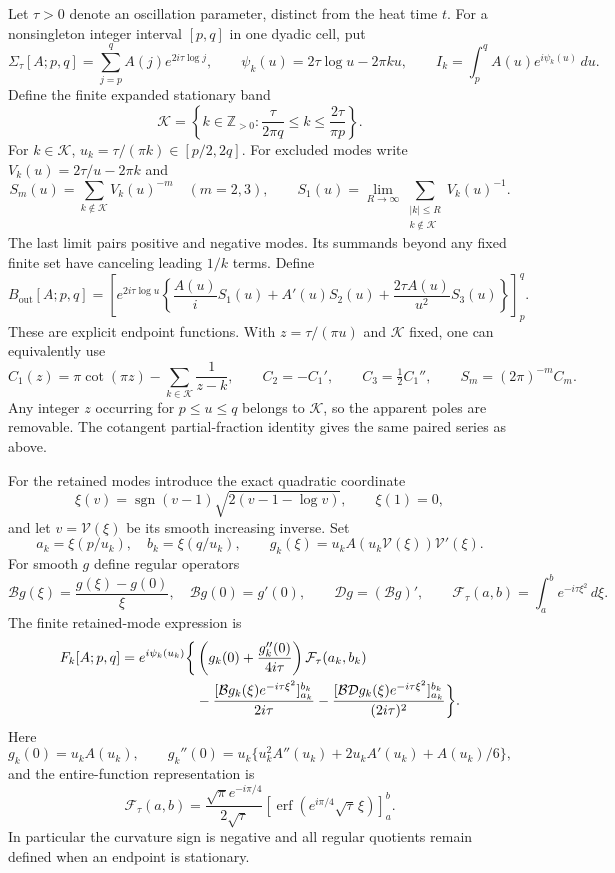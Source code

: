 \documentclass[11pt]{article}
\numberwithin{equation}{section}
\theoremstyle{definition}
\theoremstyle{remark}
\begin{document}
Let $\tau>0$ denote an oscillation parameter, distinct from the heat
time $t$.  For a nonsingleton integer interval $[p,q]$ in one dyadic
cell, put
\[
 \Sigma_\tau[A;p,q]=\sum_{j=p}^qA(j)e^{2i\tau\log j},\qquad
 \psi_k(u)=2\tau\log u-2\pi ku,\qquad
 I_k=\int_p^qA(u)e^{i\psi_k(u)}\,du.
\]
Define the finite expanded stationary band
\begin{equation}
\label{tr:stationary-band}
 \mathcal K=\left\{k\in\mathbb Z_{>0}:
       \frac{\tau}{2\pi q}\le k\le\frac{2\tau}{\pi p}\right\}.
\end{equation}
For $k\in\mathcal K$, $u_k=\tau/(\pi k)\in[p/2,2q]$.
For excluded modes write $V_k(u)=2\tau/u-2\pi k$ and
\[
 S_m(u)=\sum_{k\notin\mathcal K}V_k(u)^{-m}\quad(m=2,3),\qquad
 S_1(u)=\lim_{R\to\infty}
 \sum_{\substack{|k|\le R\\k\notin\mathcal K}}V_k(u)^{-1}.
\]
The last limit pairs positive and negative modes.  Its summands beyond
any fixed finite set have canceling leading $1/k$ terms.  Define
\begin{equation}
\label{tr:outside-boundary}
 B_{\mathrm{out}}[A;p,q]=
 \left[e^{2i\tau\log u}
 \left\{\frac{A(u)}i S_1(u)+A'(u)S_2(u)
             +\frac{2\tau A(u)}{u^2}S_3(u)\right\}\right]_p^q.
\end{equation}
These are explicit endpoint functions.  With $z=\tau/(\pi u)$ and
$\mathcal K$ fixed, one can equivalently use
\begin{equation}
\label{tr:cotangent}
 C_1(z)=\pi\cot(\pi z)-\sum_{k\in\mathcal K}\frac1{z-k},\qquad
 C_2=-C_1',\qquad C_3=\tfrac12 C_1'',\qquad
 S_m=(2\pi)^{-m}C_m.
\end{equation}
Any integer $z$ occurring for $p\le u\le q$ belongs to $\mathcal K$,
so the apparent poles are removable.  The cotangent partial-fraction
identity \cite{dlmfcot} gives the same paired series as above.

For the retained modes introduce the exact quadratic coordinate
\[
 \xi(v)=\operatorname{sgn}(v-1)\sqrt{2(v-1-\log v)},\qquad
 \xi(1)=0,
\]
and let $v=\mathcal V(\xi)$ be its smooth increasing inverse.  Set
\[
 a_k=\xi(p/u_k),\quad b_k=\xi(q/u_k),\qquad
 g_k(\xi)=u_kA(u_k\mathcal V(\xi))\mathcal V'(\xi).
\]
For smooth $g$ define regular operators
\[
 \mathcal Bg(\xi)=\frac{g(\xi)-g(0)}\xi,
 \quad \mathcal Bg(0)=g'(0),\qquad
 \mathcal Dg=(\mathcal Bg)',\qquad
 \mathcal F_\tau(a,b)=\int_a^be^{-i\tau\xi^2}\,d\xi.
\]
The finite retained-mode expression is
\begin{align}
\label{tr:retained-Fresnel}
 F_k[A;p,q]=e^{i\psi_k(u_k)}\bigg\{&
 \left(g_k(0)+\frac{g_k''(0)}{4i\tau}\right)
       \mathcal F_\tau(a_k,b_k)\notag\\
 &-\frac{[\mathcal Bg_k(\xi)e^{-i\tau\xi^2}]_{a_k}^{b_k}}{2i\tau}
 -\frac{[\mathcal B\mathcal Dg_k(\xi)e^{-i\tau\xi^2}]_{a_k}^{b_k}}
              {(2i\tau)^2}\bigg\}.
\end{align}
Here
\[
 g_k(0)=u_kA(u_k),\qquad
 g_k''(0)=u_k\{u_k^2A''(u_k)+2u_kA'(u_k)+A(u_k)/6\},
\]
and the entire-function representation is
\[
 \mathcal F_\tau(a,b)=
 \frac{\sqrt\pi e^{-i\pi/4}}{2\sqrt\tau}
 \left[\operatorname{erf}(e^{i\pi/4}\sqrt\tau\,\xi)\right]_a^b.
\]
In particular the curvature sign is negative and all regular quotients
remain defined when an endpoint is stationary.
\end{document}
